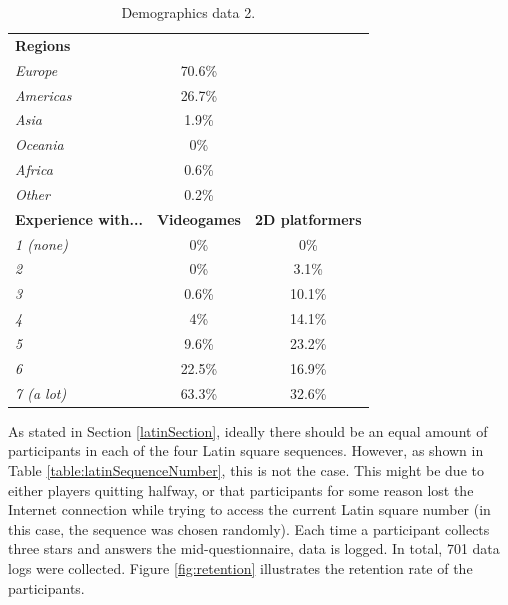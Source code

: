 \begin{table} \centering
\small
\caption{Demographics data 2.}
\label{table:demographics2}
\begin{tabular}{lcc}
\midrule
\textbf{Regions}                      &                & \textbf{}               \\ 
\textit{Europe}                      & 70.6\%         &                         \\
\textit{Americas}                    & 26.7\%         &                         \\
\textit{Asia}                        & 1.9\%          &                         \\
\textit{Oceania}                     & 0\%            &                         \\
\textit{Africa}                      & 0.6\%          &                         \\
\textit{Other}                       & 0.2\%          &                         \\
\textbf{Experience with...} & \textbf{Videogames} & \textbf{2D platformers} \\
\textit{1 (none)}                           & 0\%            & 0\%                     \\
\textit{2}                           & 0\%            & 3.1\%                   \\ 
\textit{3}                           & 0.6\%          & 10.1\%                  \\
\textit{4}                           & 4\%            & 14.1\%                  \\ 
\textit{5}                           & 9.6\%          & 23.2\%                  \\ 
\textit{6}                           & 22.5\%         & 16.9\%                  \\
\textit{7 (a lot)}                           & 63.3\%         & 32.6\%                  \\
\bottomrule
\end{tabular}
\end{table}

As stated in Section \ref{latinSection}, ideally there should be an equal amount of participants in each of the four Latin square sequences. However, as shown in Table \ref{table:latinSequenceNumber}, this is not the case. This might be due to either players quitting halfway, or that participants for some reason lost the Internet connection while trying to access the current Latin square number (in this case, the sequence was chosen randomly). Each time a participant collects three stars and answers the mid-questionnaire, data is logged. In total, 701 data logs were collected. Figure \ref{fig:retention} illustrates the retention rate of the participants.

